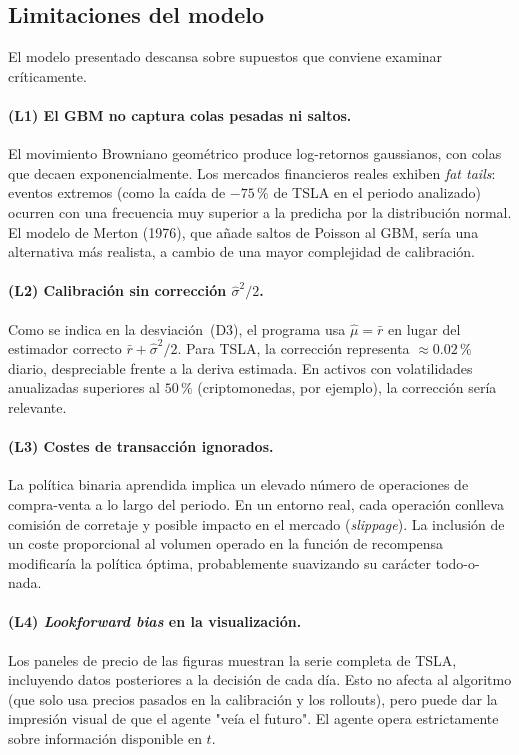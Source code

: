\subsection{Limitaciones del modelo}
\label{subsec:limitaciones-modelo}

El modelo presentado descansa sobre supuestos que conviene examinar críticamente.

\paragraph{(L1) El GBM no captura colas pesadas ni saltos.} El movimiento Browniano geométrico produce log-retornos gaussianos, con colas que decaen exponencialmente. Los mercados financieros reales exhiben \emph{fat tails}: eventos extremos (como la caída de $-75\,\%$ de TSLA en el periodo analizado) ocurren con una frecuencia muy superior a la predicha por la distribución normal. El modelo de Merton (1976), que añade saltos de Poisson al GBM, sería una alternativa más realista, a cambio de una mayor complejidad de calibración.

\paragraph{(L2) Calibración sin corrección $\hat\sigma^2/2$.} Como se indica en la desviación~(D3), el programa usa $\hat\mu = \bar r$ en lugar del estimador correcto $\bar r + \hat\sigma^2/2$. Para TSLA, la corrección representa $\approx 0{.}02\,\%$ diario, despreciable frente a la deriva estimada. En activos con volatilidades anualizadas superiores al $50\,\%$ (criptomonedas, por ejemplo), la corrección sería relevante.

\paragraph{(L3) Costes de transacción ignorados.} La política binaria aprendida implica un elevado número de operaciones de compra-venta a lo largo del periodo. En un entorno real, cada operación conlleva comisión de corretaje y posible impacto en el mercado (\emph{slippage}). La inclusión de un coste proporcional al volumen operado en la función de recompensa modificaría la política óptima, probablemente suavizando su carácter todo-o-nada.

\paragraph{(L4) \emph{Lookforward bias} en la visualización.} Los paneles de precio de las figuras muestran la serie completa de TSLA, incluyendo datos posteriores a la decisión de cada día. Esto no afecta al algoritmo (que solo usa precios pasados en la calibración y los rollouts), pero puede dar la impresión visual de que el agente "veía el futuro". El agente opera estrictamente sobre información disponible en $t$.

